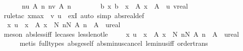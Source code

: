 \begin{isabellebody}
%
\isadelimproof
%
\endisadelimproof
%
\isatagproof
{}\isamarkupfalse%
\ {\isacharminus}{\kern0pt}\isanewline
\ \ \isamarkupfalse%
\ {}{\isacharcolon}{\kern0pt}\ {\isachardoublequoteopen}{\isasymlbrakk}{\isasymforall}n{\isasymge}u{\isachardot}{\kern0pt}\ A\ n{\isacharsemicolon}{\kern0pt}\ {\isasymforall}n{\isasymle}v{\isachardot}{\kern0pt}\ A\ n{\isasymrbrakk}\isanewline
\ \ \ \ \ \ \ {\isasymLongrightarrow}\ {\isasymexists}b{\isachardot}{\kern0pt}\ {\isasymforall}x{\isachardot}{\kern0pt}\ b\ {\isasymle}\ {\isasymbar}x{\isasymbar}\ {\isasymlongrightarrow}\ A\ x{\isachardoublequoteclose}\ \ A\ \ u\ v{\isacharcolon}{\kern0pt}{\isacharcolon}{\kern0pt}real\isanewline
\ \ \ \ \isamarkupfalse%
\ {\isacharparenleft}{\kern0pt}rule{\isacharunderscore}{\kern0pt}tac\ x{\isacharequal}{\kern0pt}{\isachardoublequoteopen}max\ {\isacharparenleft}{\kern0pt}{\isacharminus}{\kern0pt}\ v{\isacharparenright}{\kern0pt}\ u{\isachardoublequoteclose}\ \ exI{\isacharparenright}{\kern0pt}\ {\isacharparenleft}{\kern0pt}auto\ simp{\isacharcolon}{\kern0pt}\ abs{\isacharunderscore}{\kern0pt}real{\isacharunderscore}{\kern0pt}def{\isacharparenright}{\kern0pt}\isanewline
\ \ \isamarkupfalse%
\ {}{\isacharcolon}{\kern0pt}\ {\isachardoublequoteopen}{\isasymforall}x{\isachardot}{\kern0pt}\ u\ {\isasymle}\ {\isasymbar}x{\isasymbar}\ {\isasymlongrightarrow}\ A\ x\ {\isasymLongrightarrow}\ {\isasymexists}N{\isachardot}{\kern0pt}\ {\isasymforall}n{\isasymge}N{\isachardot}{\kern0pt}\ A\ n{\isachardoublequoteclose}\ \ A\ \ u{\isacharcolon}{\kern0pt}{\isacharcolon}{\kern0pt}real\isanewline
\ \ \ \ \isamarkupfalse%
\ {\isacharparenleft}{\kern0pt}meson\ abs{\isacharunderscore}{\kern0pt}less{\isacharunderscore}{\kern0pt}iff\ le{\isacharunderscore}{\kern0pt}cases\ less{\isacharunderscore}{\kern0pt}le{\isacharunderscore}{\kern0pt}not{\isacharunderscore}{\kern0pt}le{\isacharparenright}{\kern0pt}\isanewline
\ \ \isamarkupfalse%
\ {}{\isacharcolon}{\kern0pt}\ {\isachardoublequoteopen}{\isasymforall}x{\isachardot}{\kern0pt}\ u\ {\isasymle}\ {\isasymbar}x{\isasymbar}\ {\isasymlongrightarrow}\ A\ x\ {\isasymLongrightarrow}\ {\isasymexists}N{\isachardot}{\kern0pt}\ {\isasymforall}n{\isasymle}N{\isachardot}{\kern0pt}\ A\ n{\isachardoublequoteclose}\ \ A\ \ u{\isacharcolon}{\kern0pt}{\isacharcolon}{\kern0pt}real\isanewline
\ \ \ \ \isamarkupfalse%
\ {\isacharparenleft}{\kern0pt}metis\ {\isacharparenleft}{\kern0pt}full{\isacharunderscore}{\kern0pt}types{\isacharparenright}{\kern0pt}\ abs{\isacharunderscore}{\kern0pt}ge{\isacharunderscore}{\kern0pt}self\ abs{\isacharunderscore}{\kern0pt}minus{\isacharunderscore}{\kern0pt}cancel\ le{\isacharunderscore}{\kern0pt}minus{\isacharunderscore}{\kern0pt}iff\ order{\isacharunderscore}{\kern0pt}trans{\isacharparenright}{\kern0pt}\isanewline

\end{isabellebody}
